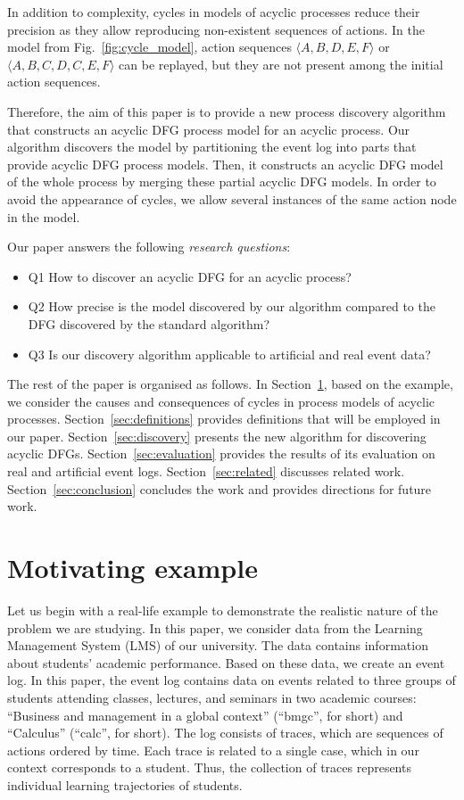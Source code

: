 \documentclass[11pt]{article}
\theoremstyle{definition}
\begin{document}
In addition to complexity, cycles in models of acyclic processes reduce their precision as they allow reproducing non-existent sequences of actions. In the model from Fig.~\ref{fig:cycle_model}, action sequences $\langle A, B, D, E, F \rangle$ or $\langle A, B, C, D, C, E, F \rangle$ can be replayed, but they are not present among the initial action sequences.

Therefore, the aim of this paper is to provide a new process discovery algorithm that constructs an acyclic DFG process model for an acyclic process. 
Our algorithm discovers the model by partitioning the event log into parts that provide acyclic DFG process models. 
Then, it constructs an acyclic DFG model of the whole process by merging these partial acyclic DFG models. In order to avoid the appearance of cycles, we allow several instances of the same action node in the model.

Our paper answers the following \emph{research questions}:
\begin{itemize}
    \item Q1 How to discover an acyclic DFG for an acyclic process?
    \item Q2 How precise is the model discovered by our algorithm compared to the DFG discovered by the standard algorithm?
    \item Q3 Is our discovery algorithm applicable to artificial and real event data?
\end{itemize}

The rest of the paper is organised as follows. In Section~\ref{sec:motivation}, based on the example, we consider the causes and consequences of cycles in process models of acyclic processes. Section~\ref{sec:definitions} provides definitions that will be 
employed in our paper. 
Section~\ref{sec:discovery} presents the new algorithm for discovering acyclic DFGs. 
Section~\ref{sec:evaluation} provides the results of its evaluation on real and artificial event logs. 
Section~\ref{sec:related} discusses related work. Section~\ref{sec:conclusion} concludes the work and provides directions for future work.

\section{Motivating example}\label{sec:motivation}

Let us begin with a real-life example to demonstrate the realistic nature of the problem we are studying.
In this paper, we consider data from the Learning Management System (LMS) of our university. 
The data contains information about students' academic performance. Based on these data, we create an event log.
In this paper, the event log contains  data on events related to  three groups of students  attending classes, lectures, and seminars in two academic courses: ``Business and management in a global context'' (``bmgc'', for short) and ``Calculus'' (``calc'', for short). 
The log consists of traces, which are sequences of actions ordered by time.
Each trace is related to a single case, which in our context corresponds to a student. 
Thus, the collection of traces represents individual learning trajectories of students.
\end{document}
